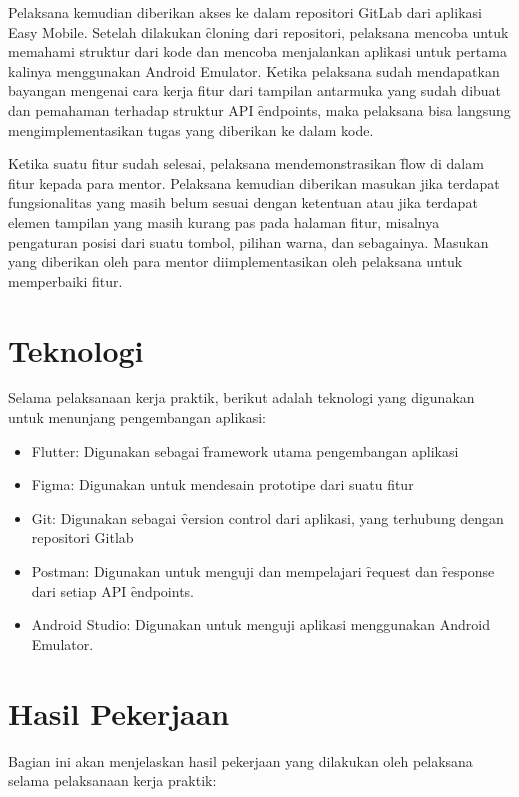 Pelaksana kemudian diberikan akses ke dalam repositori GitLab dari aplikasi Easy
Mobile. Setelah dilakukan \f{cloning} dari repositori, pelaksana mencoba untuk
memahami struktur dari kode dan mencoba menjalankan aplikasi untuk pertama
kalinya menggunakan Android Emulator. Ketika pelaksana sudah mendapatkan
bayangan mengenai cara kerja fitur dari tampilan antarmuka yang sudah dibuat dan
pemahaman terhadap struktur API \f{endpoints}, maka pelaksana bisa langsung
mengimplementasikan tugas yang diberikan ke dalam kode.

Ketika suatu fitur sudah selesai, pelaksana mendemonstrasikan \f{flow} di dalam
fitur kepada para mentor. Pelaksana kemudian diberikan masukan jika terdapat
fungsionalitas yang masih belum sesuai dengan ketentuan atau jika terdapat
elemen tampilan yang masih kurang pas pada halaman fitur, misalnya pengaturan
posisi dari suatu tombol, pilihan warna, dan sebagainya. Masukan yang diberikan
oleh para mentor diimplementasikan oleh pelaksana untuk memperbaiki fitur.



\section{Teknologi}
\label{sec:teknologi}
Selama pelaksanaan kerja praktik, berikut adalah teknologi yang digunakan untuk
menunjang pengembangan aplikasi:

\begin{itemize}
    \item Flutter: Digunakan sebagai \f{framework} utama pengembangan aplikasi
    \item Figma: Digunakan untuk mendesain prototipe dari suatu fitur
    \item Git: Digunakan sebagai \f{version control} dari aplikasi, yang
    terhubung dengan repositori Gitlab
    \item Postman: Digunakan untuk menguji dan mempelajari \f{request} dan
    \f{response} dari setiap API \f{endpoints}.
    \item Android Studio: Digunakan untuk menguji aplikasi menggunakan Android
    Emulator.
\end{itemize}



\section{Hasil Pekerjaan}
\label{sec:hasilPekerjaan}
Bagian ini akan menjelaskan hasil pekerjaan yang dilakukan oleh pelaksana selama
pelaksanaan kerja praktik:

